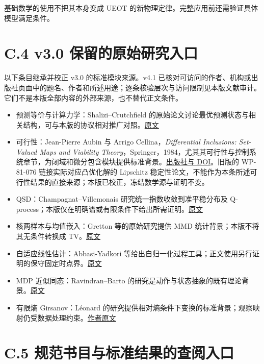 \documentclass[
  11pt,
  oneside]{book}
\providecommand{\tightlist}{%
  \setlength{\itemsep}{0pt}\setlength{\parskip}{0pt}}
\begin{document}
基础数学的使用不把其本身变成 UEOT 的新物理定律。完整应用前还需验证具体模型满足条件。

\section{C.4 v3.0 保留的原始研究入口}\label{c.4-v3.0-ux4fddux7559ux7684ux539fux59cbux7814ux7a76ux5165ux53e3}

以下条目继承并校正 v3.0 的标准模块来源。v4.1 已核对可访问的作者、机构或出版社页面中的题名、作者和所述用途；逐条核验层次与访问限制见本版文献审计。它们不是本版全部内容的外部来源，也不替代正文条件。

\begin{itemize}
\tightlist
\item
  预测等价与计算力学：Shalizi--Crutchfield 的原始论文讨论最优预测状态与相关结构，可与本版的协议相对推广对照。\href{https://arxiv.org/abs/cond-mat/9907176}{原文}
\item
  可行性：Jean-Pierre Aubin 与 Arrigo Cellina，\emph{Differential Inclusions: Set-Valued Maps and Viability Theory}，Springer，1984，尤其其可行性与控制系统章节，为闭域和微分包含模块提供标准背景。\href{https://doi.org/10.1007/978-3-642-69512-4}{出版社与 DOI}。旧版的 WP-81-076 链接实际对应凸优化解的 Lipschitz 稳定性论文，不能作为本条所述可行性结果的直接来源；本版已校正，冻结数学源与证明不变。
\item
  QSD：Champagnat--Villemonais 研究统一指数收敛到准平稳分布及 Q-process；本版仅在明确谱或有限条件下给出所需证明。\href{https://arxiv.org/abs/1404.1349}{原文}
\item
  核两样本与均值嵌入：Gretton 等的原始研究提供 MMD 统计背景；本版不将其无条件转换成 TV。\href{https://www.jmlr.org/papers/volume13/gretton12a/gretton12a.pdf}{原文}
\item
  自适应线性估计：Abbasi-Yadkori 等给出自归一化过程工具；正文使用另行证明的保守固定时点界。\href{https://arxiv.org/abs/1102.2670}{原文}
\item
  MDP 近似同态：Ravindran--Barto 的研究是动作与状态抽象的既有理论背景。\href{https://all.cs.umass.edu/pubs/2004/ravindran_b_KBCS04.pdf}{原文}
\item
  有限熵 Girsanov：Léonard 的研究提供相对熵条件下变换的标准背景；观察映射仍受数据处理约束。\href{https://leonard.perso.math.cnrs.fr/papers/2012-Leonard-Girsanov\%20theory\%20under\%20a\%20finite\%20entropy\%20condition.pdf}{作者原文}
\end{itemize}

\section{C.5 规范书目与标准结果的查阅入口}\label{c.5-ux89c4ux8303ux4e66ux76eeux4e0eux6807ux51c6ux7ed3ux679cux7684ux67e5ux9605ux5165ux53e3}
\end{document}
